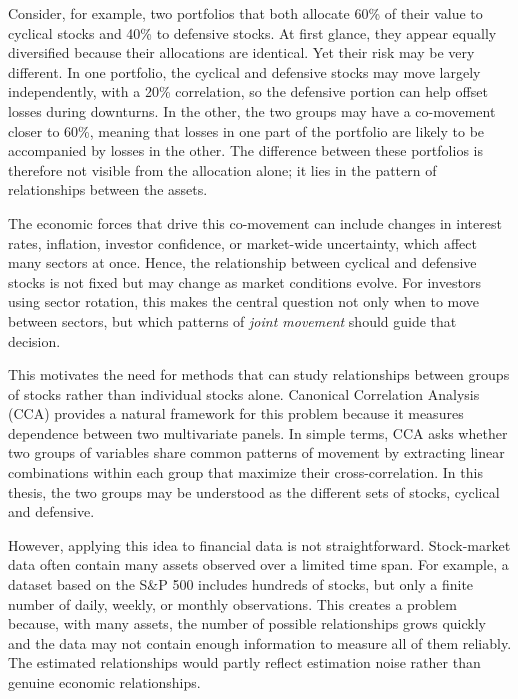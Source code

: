 \documentclass[12pt]{report} %
\begin{document}
Consider, for example, two portfolios that both allocate 60\% of their value to cyclical 
stocks and 40\% to defensive stocks. At first glance, they appear equally diversified 
because their allocations are identical. Yet their risk may be very different. In one 
portfolio, the cyclical and defensive stocks may move largely independently, with a 20\% 
correlation, so the defensive portion can help offset losses during downturns. 
In the other, the two groups may have a co-movement closer to 60\%, meaning that losses 
in one part of the portfolio are likely to be accompanied by losses in the other. 
The difference between these portfolios is therefore not visible from the allocation 
alone; it lies in the pattern of relationships between the assets.

The economic forces that drive this co-movement can include changes in interest 
rates, inflation, investor confidence, or market-wide uncertainty, which affect many 
sectors at once. Hence, the relationship between cyclical and defensive stocks is not 
fixed but may change as market conditions evolve. For investors using sector rotation, 
this makes the central question not only when to move between sectors, but which patterns 
of \textit{joint movement} should guide that decision.

This motivates the need for methods that can study relationships between groups of stocks 
rather than individual stocks alone. Canonical Correlation Analysis (CCA) provides 
a natural framework for this problem because it measures dependence between two multivariate 
panels. In simple terms, CCA asks whether two groups of variables share 
common patterns of movement by extracting linear combinations within each group that 
maximize their cross-correlation. In this thesis, the two groups may be
understood as the different sets of stocks, cyclical and defensive.

However, applying this idea to financial data is not straightforward. Stock-market data 
often contain many assets observed over a limited time span. For example, a 
dataset based on the S\&P 500 includes hundreds of stocks, but only a finite number of 
daily, weekly, or monthly observations. This creates a problem because, with many assets, 
the number of possible relationships grows quickly and the data may not contain enough 
information to measure all of them reliably. The estimated relationships would partly 
reflect estimation noise rather than genuine economic relationships. 
\end{document}
